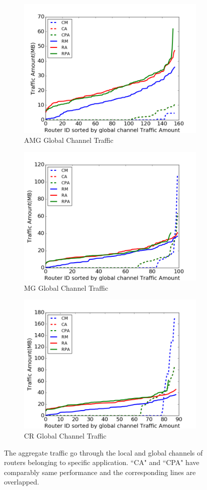 \documentclass[conference,compsoc]{IEEEtran}
\begin{document}
\begin{figure}[t]
    \centering
    \begin{subfigure}[t]{0.32\textwidth}
        \centering
        \includegraphics[height=1.8 in]{wkld/amg/gc-traffic}
        \caption{AMG Global Channel Traffic}
        \label{fig:amg-gc-traffic}
    \end{subfigure}\hfill
    \hspace{1em}%
    \begin{subfigure}[t]{0.32\textwidth}
        \centering
        \includegraphics[height=1.8 in]{wkld/mg/gc-traffic}
        \caption{MG Global Channel Traffic}
        \label{fig:mg-gc-traffic}
    \end{subfigure}\hfill
    \begin{subfigure}[t]{0.32\textwidth}
        \centering
        \includegraphics[height=1.8 in]{wkld/cr/gc-traffic}
        \caption{CR Global Channel Traffic}
        \label{fig:cr-gc-traffic}
    \end{subfigure}%
   \caption{The aggregate traffic go through the local and global channels of routers belonging to specific application. ``CA" and ``CPA" have comparably same performance and the corresponding lines are overlapped.}
   \label{fig:3app-lc-gc-traffic}
\end{figure}
\end{document}
